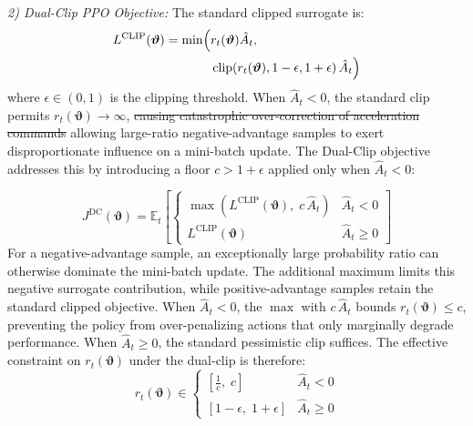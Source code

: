 \documentclass[lettersize,journal]{IEEEtran}
\newcommand{\hladd}[1]{{\color{blue}#1}}
\newcommand{\hldel}[1]{{\color{red}\sout{#1}}}
\begin{document}
\emph{2) Dual-Clip PPO Objective:} The standard clipped surrogate is:
\begin{equation}
\label{eq:standard_clip}
\begin{split}
L^{\mathrm{CLIP}}(\boldsymbol{\vartheta}) = \min \Bigl( &r_t(\boldsymbol{\vartheta})\hat{A}_t, \\
&\operatorname{clip}\!\left(r_t(\boldsymbol{\vartheta}), 1-\epsilon, 1+\epsilon\right)\hat{A}_t \Bigr)
\end{split}
\end{equation}
where $\epsilon \in (0,1)$ is the clipping threshold. When
$\hat{A}_t < 0$, the standard clip permits
$r_t(\boldsymbol{\vartheta}) \to \infty$,
\hldel{causing catastrophic over-correction of acceleration commands}
\hladd{allowing large-ratio negative-advantage samples to exert
disproportionate influence on a mini-batch update}. The Dual-Clip
objective addresses this by introducing a floor $c > 1+\epsilon$
applied only when $\hat{A}_t < 0$:

\begin{equation}
\label{eq:dual_clip_final}
J^{\mathrm{DC}}(\boldsymbol{\vartheta}) = \mathbb{E}_{t} \left[
\begin{cases}
\max\!\left( L^{\mathrm{CLIP}}(\boldsymbol{\vartheta}),\; c\,\hat{A}_t \right) & \hat{A}_t < 0 \\[4pt]
L^{\mathrm{CLIP}}(\boldsymbol{\vartheta}) & \hat{A}_t \geq 0
\end{cases}
\right]
\end{equation}
\hladd{For a negative-advantage sample, an exceptionally large
probability ratio can otherwise dominate the mini-batch update. The
additional maximum limits this negative surrogate contribution, while
positive-advantage samples retain the standard clipped objective.}
When $\hat{A}_t < 0$, the $\max$ with $c\,\hat{A}_t$ bounds $r_t(\boldsymbol{\vartheta}) \leq c$, preventing the policy from over-penalizing actions that only marginally degrade performance. When $\hat{A}_t \geq 0$, the standard pessimistic clip suffices. The effective constraint on $r_t(\boldsymbol{\vartheta})$ under the dual-clip is therefore:
\begin{equation}
\label{eq:rt_bound}
r_t(\boldsymbol{\vartheta}) \in \begin{cases} \left[\frac{1}{c},\; c\right] & \hat{A}_t < 0 \\[4pt] \left[1-\epsilon,\; 1+\epsilon\right] & \hat{A}_t \geq 0 \end{cases}
\end{equation}
\end{document}
